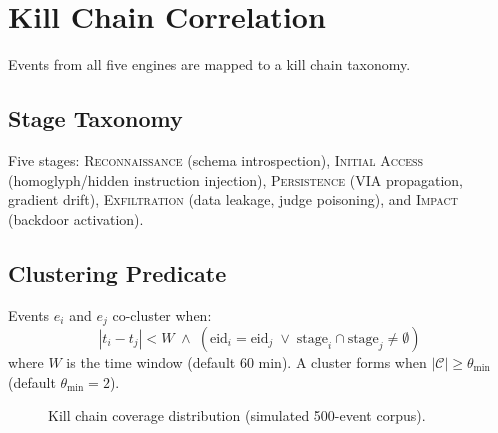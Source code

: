 \documentclass[11pt,twocolumn]{article}
\begin{document}
\section{Kill Chain Correlation}
\label{sec:killchain}

Events from all five engines are mapped to a kill chain taxonomy.

\subsection{Stage Taxonomy}

Five stages: \textsc{Reconnaissance} (schema introspection), \textsc{Initial Access} (homoglyph/hidden instruction injection), \textsc{Persistence} (VIA propagation, gradient drift), \textsc{Exfiltration} (data leakage, judge poisoning), and \textsc{Impact} (backdoor activation).

\subsection{Clustering Predicate}

Events $e_i$ and $e_j$ co-cluster when:
\begin{equation}
|t_i - t_j| < W \;\land\; (\text{eid}_i = \text{eid}_j \;\lor\; \text{stage}_i \cap \text{stage}_j \neq \emptyset)
\label{eq:cluster}
\end{equation}
where $W$ is the time window (default 60 min). A cluster forms when $|\mathcal{C}| \geq \theta_{\min}$ (default $\theta_{\min} = 2$).

\begin{figure}[h]
\centering
{}
\caption{Kill chain coverage distribution (simulated 500-event corpus).}
\label{fig:killchain}
\end{figure}
\end{document}
